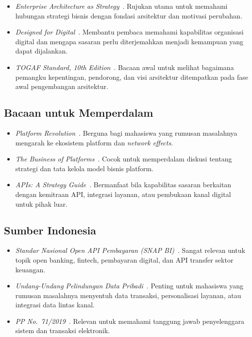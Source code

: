 \begin{itemize}
  \item \emph{Enterprise Architecture as Strategy}~\cite{ross2006enterprise}.
        Rujukan utama untuk memahami hubungan strategi bisnis dengan fondasi
        arsitektur dan motivasi perubahan.
  \item \emph{Designed for Digital}~\cite{ross2019designed}. Membantu pembaca
        memahami kapabilitas organisasi digital dan mengapa sasaran perlu
        diterjemahkan menjadi kemampuan yang dapat dijalankan.
  \item \emph{TOGAF Standard, 10th Edition}~\cite{togaf10}. Bacaan awal untuk
        melihat bagaimana pemangku kepentingan, pendorong, dan visi arsitektur
        ditempatkan pada fase awal pengembangan arsitektur.
\end{itemize}

\subsection*{Bacaan untuk Memperdalam}

\begin{itemize}
  \item \emph{Platform Revolution}~\cite{parker2016platform}. Berguna bagi
        mahasiswa yang rumusan masalahnya mengarah ke ekosistem platform dan
        \emph{network effects}.
  \item \emph{The Business of Platforms}~\cite{cusumano2019business}. Cocok
        untuk memperdalam diskusi tentang strategi dan tata kelola model bisnis
        platform.
  \item \emph{APIs: A Strategy Guide}~\cite{jacobson2011apis}. Bermanfaat bila
        kapabilitas sasaran berkaitan dengan kemitraan API, integrasi layanan,
        atau pembukaan kanal digital untuk pihak luar.
\end{itemize}

\subsection*{Sumber Indonesia}

\begin{itemize}
  \item \emph{Standar Nasional Open API Pembayaran (SNAP BI)}~\cite{snapbi}.
        Sangat relevan untuk topik open banking, fintech, pembayaran digital,
        dan API transfer sektor keuangan.
  \item \emph{Undang-Undang Pelindungan Data Pribadi}~\cite{uupdp2022}. Penting
        untuk mahasiswa yang rumusan masalahnya menyentuh data transaksi,
        personalisasi layanan, atau integrasi data lintas kanal.
  \item \emph{PP No.~71/2019}~\cite{pp712019}. Relevan untuk memahami tanggung
        jawab penyelenggara sistem dan transaksi elektronik.
\end{itemize}

